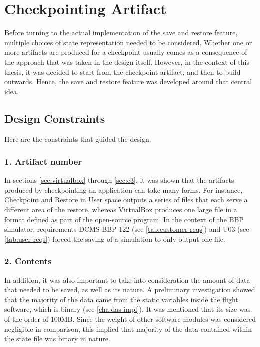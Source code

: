 {
\setlength{\parindent}{2em}
\chapter{Checkpointing Artifact} \label{cha:prod-artifact}
Before turning to the actual implementation of the save and restore feature, multiple choices of state representation needed to be considered. Whether one or more artifacts are produced for a checkpoint usually comes as a consequence of the approach that was taken in the design itself. However, in the context of this thesis, it was decided to start from the checkpoint artifact, and then to build outwards. Hence, the save and restore feature was developed around that central idea.

\section{Design Constraints}\label{sec:file-constraints}
Here are the constraints that guided the design.

\subsection*{1. Artifact number}
In sections \ref{sec:virtualbox} through \ref{sec:c3}, it was shown that the artifacts produced by checkpointing an application can take many forms. For instance, Checkpoint and Restore in User space outputs a series of files that each serve a different area of the restore, whereas VirtualBox produces one large file in a format defined as part of the open-source program. In the context of the BBP simulator, requirements DCMS-BBP-122 (see \autoref{tab:customer-reqs}) and U03 (see \autoref{tab:user-reqs}) forced the saving of a simulation to only output one file.

\subsection*{2. Contents}
In addition, it was also important to take into consideration the amount of data that needed to be saved, as well as its nature. A preliminary investigation showed that the majority of the data came from the static variables inside the flight software, which is binary (see \autoref{cha:das-impl}). It was mentioned that its size was of the order of 100MB. Since the weight of other software modules was considered negligible in comparison, this implied that majority of the data contained within the state file was binary in nature.

}
